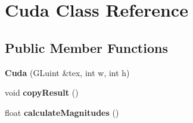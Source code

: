 \hypertarget{classCuda}{\section{Cuda Class Reference}
\label{classCuda}
}
\subsection*{Public Member Functions}
\begin{DoxyCompactItemize}
\item 
\hypertarget{classCuda_a696b98bc742d3444000a6e9e6ffa73e0}{{\bfseries Cuda} (G\-Luint \&tex, int w, int h)}\label{classCuda_a696b98bc742d3444000a6e9e6ffa73e0}

\item 
\hypertarget{classCuda_aa44dea38e94b256cf9bb956e125d16a2}{void {\bfseries copy\-Result} ()}\label{classCuda_aa44dea38e94b256cf9bb956e125d16a2}

\item 
\hypertarget{classCuda_abcbbec0368cac0adfa4268b095679a11}{float {\bfseries calculate\-Magnitudes} ()}\label{classCuda_abcbbec0368cac0adfa4268b095679a11}

\end{DoxyCompactItemize}
